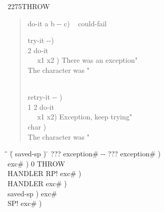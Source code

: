 \begin{worddef}{2275}{THROW}
\begin{rationale}
\begin{quote}
			\word{:} do-it  a b -{}- c) ~
				 could-fail \word{;}

			\word{:} try-it  -{}-) \\
			 2 \word{[']} do-it~ ~  \\
			\tab~~  x1 x2 ) 
				  There was an exception"  \\
			\tab {}
				 The character was "   \\
			\tab {} \\
			\word{;}

			\word{;} retry-it  -{}- ) \\
			\tab {}  1 2 \word{[']} do-it ~
				 \\
			\tab~~  x1 x2) 
				 Exception, keep trying"  \\
			\tab {}  char ) \\
			\tab {} The character was "   \\
			\word{;}
		\end{quote}
	\end{rationale}

	\begin{implement} %

		\begin{tabbing}
		\tab \= \tab \= \hspace{7em} \= ( saved-sp ) \= \kill
		\+ \word{:}   ??? exception\# -{}- ??? exception\# ) \\
			\+  			\>	\>  exc\# )		\>  0 THROW  \\
				HANDLER  RP!				\>  exc\# )		\>   \\
				 HANDLER \word{!}		\>  exc\# )		\>   \\
				  	\>  saved-sp )	\>  exc\#  \\
				SP!  		\>  exc\# )		\> \word{bs} \textdf{restore stack} \\
				  \\
				  \\
			\-	  \\
		\-  \\
		\word{;}
		\end{tabbing}
	\end{implement}


\end{worddef}
